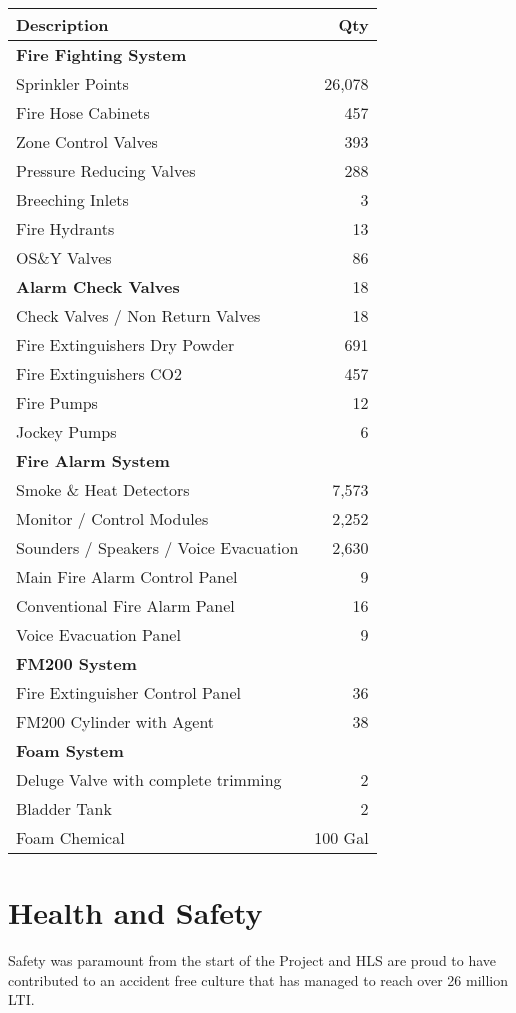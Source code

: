 \documentclass[justified, 11pt, a4paper]{tufte-book}
\begin{document}
\begin{tabular}{lr}
\toprule
\textbf{Description}	 &\textbf{Qty}\\
\midrule 	 
\textbf{Fire Fighting System}	 &\\
Sprinkler Points	    &26,078\\
Fire Hose Cabinets	    &457 \\
Zone Control Valves	    &393 \\
Pressure Reducing Valves	 &288 \\
Breeching Inlets	        &3\\ 
Fire Hydrants	            &13\\ 
OS\&Y Valves	               &86\\ 
\textbf{Alarm Check Valves}	              &18 \\
Check Valves / Non Return Valves &18 \\
Fire Extinguishers Dry Powder	 &691 \\
Fire Extinguishers CO2	           &457 \\
Fire Pumps	                     &12 \\
Jockey Pumps	                     &6 \\
\midrule 	 
\textbf{Fire Alarm System}	 &\\
Smoke \& Heat Detectors	 &7,573 \\
Monitor / Control Modules	       &2,252 \\
Sounders / Speakers / Voice Evacuation	   &2,630 \\
Main Fire Alarm Control Panel	         &9 \\
Conventional Fire Alarm Panel	        &16 \\
Voice Evacuation Panel	                  &9 \\
\midrule 
\textbf{FM200 System}	 &\\
Fire Extinguisher Control Panel	&36 \\
FM200 Cylinder with Agent	            &38 \\
\midrule 	 
\textbf{Foam System}	 &\\
Deluge Valve with complete trimming	 &2 \\
Bladder Tank	                        &2 \\
Foam Chemical	                   &100 Gal\\
\bottomrule
\end{tabular}

\section{Health and Safety}
Safety was paramount from the start of the Project and HLS are proud to have contributed to an accident free culture that has managed to reach over 26 million LTI.
\end{document}
